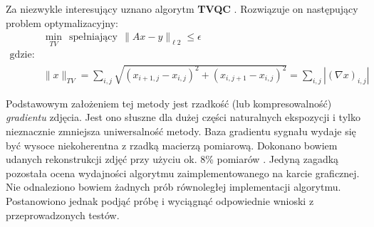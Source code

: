 Za niezwykle interesujący uznano algorytm \textbf{TVQC} \cite{Candes2005a,Candes2005b}. Rozwiązuje on następujący problem optymalizacyjny:
\begin{equation}
\begin{split}
& \min_{TV} ~~\text{spełniający}~~\|Ax - y \|_{\ell 2} \le \epsilon \\
\text{gdzie:} &\\
              & \|x \|_{TV} = \sum_{i,j} \sqrt{ \left( x_{i+1,j} - x_{i,j} \right)^2 + \left( x_{i,j+1} - x_{i,j} \right) ^2} = \sum_{i,j}|\left(\nabla x \right)_{i,j} |
\label{eq:TV}
\end{split}
\end{equation}

Podstawowym założeniem tej metody jest rzadkość (lub kompresowalność) \textit{gradientu} zdjęcia. Jest ono słuszne dla dużej części naturalnych ekspozycji i tylko nieznacznie zmniejsza uniwersalność metody. Baza gradientu sygnału wydaje się być wysoce niekoherentna z rzadką macierzą pomiarową. Dokonano bowiem udanych rekonstrukcji zdjęć przy użyciu ok. 8\% pomiarów \cite{Berinde2008}. Jedyną zagadką pozostała ocena wydajności algorytmu zaimplementowanego na karcie graficznej. Nie odnaleziono bowiem żadnych prób równoległej implementacji algorytmu. Postanowiono jednak podjąć próbę i wyciągnąć odpowiednie wnioski z przeprowadzonych testów.
